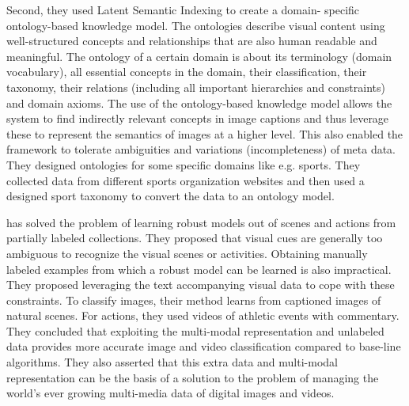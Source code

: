Second, they used Latent Semantic Indexing to create a domain-
specific ontology-based knowledge model. The ontologies describe 
visual content using well-structured concepts and relationships that 
are also human readable and meaningful. The ontology of a certain 
domain is about its terminology (domain vocabulary), all essential 
concepts in the domain, their classification, their taxonomy, their 
relations (including all important hierarchies and constraints) and 
domain axioms. The use of the ontology-based knowledge model allows 
the system to find indirectly relevant concepts in image captions 
and thus leverage these to represent the semantics of images at a 
higher level. This also enabled the framework to tolerate 
ambiguities and variations (incompleteness) of meta data. They 
designed ontologies for some specific domains like e.g. sports. They 
collected data from different sports organization websites and then 
used a designed sport taxonomy to convert the data to an ontology model.


\citet*{gupta} has solved the problem of learning robust models out 
of scenes and actions from partially labeled collections. They 
proposed that visual cues are generally too ambiguous to recognize 
the visual scenes or activities. Obtaining manually labeled 
examples from which a robust model can be learned is also impractical.  
They proposed leveraging the text accompanying visual data to 
cope with these constraints. To classify images, their method learns 
from captioned images of natural scenes. For actions, they used 
videos of athletic events with commentary. They concluded that 
exploiting the multi-modal representation and unlabeled data 
provides more accurate image and video classification compared to 
base-line algorithms. They also asserted that this extra data and 
multi-modal representation can be the basis of a solution to the 
problem of managing the world's ever growing multi-media data of 
digital images and videos.


